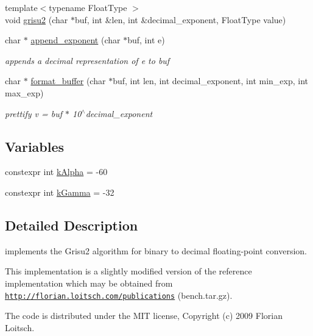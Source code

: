 \begin{DoxyCompactItemize}
{\footnotesize template$<$typename Float\+Type $>$ }\\void \hyperlink{namespacenlohmann_1_1detail_1_1dtoa__impl_aab7a9670a4f4704a5d0347ad7588576b}{grisu2} (char $\ast$buf, int \&len, int \&decimal\+\_\+exponent, Float\+Type value)
\item 
char $\ast$ \hyperlink{namespacenlohmann_1_1detail_1_1dtoa__impl_a84733638b826eda624488f5fa4521e0b}{append\+\_\+exponent} (char $\ast$buf, int e)
\begin{DoxyCompactList}\small\item\em appends a decimal representation of e to buf \end{DoxyCompactList}\item 
char $\ast$ \hyperlink{namespacenlohmann_1_1detail_1_1dtoa__impl_a12c1c5d8b46ba9702186445e73f86afe}{format\+\_\+buffer} (char $\ast$buf, int len, int decimal\+\_\+exponent, int min\+\_\+exp, int max\+\_\+exp)
\begin{DoxyCompactList}\small\item\em prettify v = buf $\ast$ 10$^\wedge$decimal\+\_\+exponent \end{DoxyCompactList}\end{DoxyCompactItemize}
\subsection*{Variables}
\begin{DoxyCompactItemize}
\item 
constexpr int \hyperlink{namespacenlohmann_1_1detail_1_1dtoa__impl_ac1ea1316de0b4a219f707c76b1db1966}{k\+Alpha} = -\/60
\item 
constexpr int \hyperlink{namespacenlohmann_1_1detail_1_1dtoa__impl_a4a750fcc38da1ce68b7e25ab3a230e20}{k\+Gamma} = -\/32
\end{DoxyCompactItemize}


\subsection{Detailed Description}
implements the Grisu2 algorithm for binary to decimal floating-\/point conversion. 

This implementation is a slightly modified version of the reference implementation which may be obtained from \href{http://florian.loitsch.com/publications}{\tt http\+://florian.\+loitsch.\+com/publications} (bench.\+tar.\+gz).

The code is distributed under the M\+IT license, Copyright (c) 2009 Florian Loitsch.

